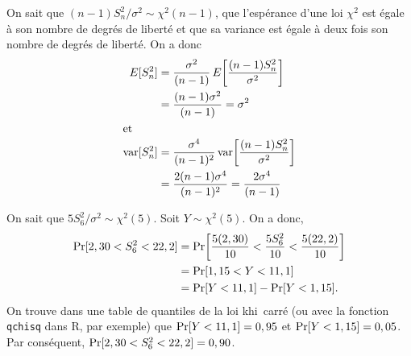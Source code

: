 \begin{solution}{2.5}
    On sait que $(n-1)S^2_n/\sigma^2 \sim \chi^2(n - 1)$, que l'espérance
    d'une loi $\chi^2$ est égale à son nombre de degrés de liberté et
    que sa variance est égale à deux fois son nombre de degrés de
    liberté. On a donc
    \begin{align*}
      E [ S^2_n ]
      &= \frac{\sigma^2}{(n-1)}\, E\! \left[ \frac{(n-1)S^2_n}{\sigma^2} \right]\\\
      &= \frac{(n - 1) \sigma^2}{(n-1)}=\sigma^2 \\
      \intertext{et}
      \mathrm{var} [ S^2_n ]
      &= \frac{\sigma^4}{(n-1)^2}\, \mathrm{var}\! \left[ \frac{(n-1)S^2_n}{\sigma^2} \right]\\
      &= \frac{2 (n - 1) \sigma^4}{(n-1)^2}= \frac{2 \sigma^4}{(n-1)}
    \end{align*}
  
\end{solution}
\begin{solution}{2.6}
    On sait que $5S^2_6/\sigma^2 \sim \chi^2(5)$. Soit $Y \sim
    \chi^2(5)$. On a donc,
    \begin{align*}
      \mathrm{Pr} [ 2,30 < S^2_6 < 22,2 ]
      &= \mathrm{Pr}\! \left[ \frac{5 (2,30)}{10} <
        \frac{5 S^2_6}{10} <
        \frac{5 (22,2)}{10} \right] \\
      &= \mathrm{Pr} [ 1,15 < Y < 11,1 ]\\
      &= \mathrm{Pr} [ Y < 11,1 ] - \mathrm{Pr} [ Y <  1,15 ].
    \end{align*}
    On trouve dans une table de quantiles de la loi khi~carré (ou avec
    la fonction \texttt{qchisq} dans \textsf{R}, par exemple) que
    $\mathrm{Pr} [ Y < 11,1 ] = 0,95$ et $\mathrm{Pr} [ Y < 1,15 ] = 0,05$. Par
    conséquent, $\mathrm{Pr} [ 2,30 < S^2_6 < 22,2 ] = 0,90$.
  
\end{solution}
